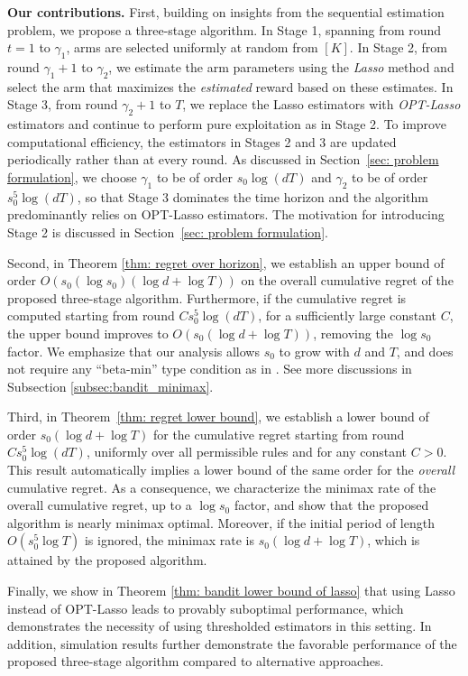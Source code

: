 \documentclass[aos,preprint]{imsart}
\theoremstyle{plain}
\theoremstyle{definition}
\begin{document}
 
\smallskip
\noindent \textbf{Our contributions.} First, building on insights from the sequential estimation problem, we propose a three-stage algorithm. In Stage 1, spanning from round $t = 1$ to $\gamma_1$, arms are selected uniformly at random from $[K]$. In Stage 2, from round $\gamma_1 + 1$ to $\gamma_2$, we estimate the arm parameters using the \textit{Lasso} method and select the arm that maximizes the \textit{estimated} reward based on these estimates. In Stage 3, from round $\gamma_2 + 1$ to $T$, we replace the Lasso estimators with \textit{OPT-Lasso} estimators and continue to perform pure exploitation as in Stage 2. 
To improve computational efficiency, the estimators in Stages 2 and 3 are updated periodically rather than at every round. As discussed in Section~\ref{sec: problem formulation}, we choose $\gamma_1$ to be of order $s_0 \log(dT)$ and $\gamma_2$ to be of order $s_0^5 \log(dT)$, so that Stage 3 dominates the time horizon and the algorithm predominantly relies on OPT-Lasso estimators. The motivation for introducing Stage 2 is discussed in Section~\ref{sec: problem formulation}.

Second, in Theorem \ref{thm: regret over horizon}, we establish an upper bound of order $O(s_0 (\log s_0) (\log d + \log T))$ on the overall cumulative regret of the proposed three-stage algorithm. Furthermore, if the cumulative regret is computed starting from round $C s_0^5 \log(dT)$, for a sufficiently large constant $C$, the upper bound improves to $O\left(s_0 (\log d + \log T)\right)$, removing the $\log s_0$ factor. We emphasize that our analysis allows $s_0$ to grow with $d$ and $T$, and does not require any ``beta-min'' type condition as in \cite{ariu2022thresholded}. See more discussions in Subsection \ref{subsec:bandit_minimax}.

Third, in Theorem~\ref{thm: regret lower bound}, we establish a lower bound of order $s_0 (\log d + \log T)$ for the cumulative regret starting from round $C s_0^5 \log(dT)$, uniformly over all permissible rules and for any constant $C > 0$. This result automatically implies a lower bound of the same order for the \textit{overall} cumulative regret. As a consequence, we characterize the minimax rate of the overall cumulative regret, up to a $\log s_0$ factor, and show that the proposed algorithm is nearly minimax optimal. Moreover, if the initial period of length $O(s_0^5 \log T)$ is ignored, the minimax rate is $s_0 (\log d + \log T)$, which is attained by the proposed algorithm.

Finally, we show in Theorem \ref{thm: bandit lower bound of lasso} that using Lasso instead of OPT-Lasso leads to provably suboptimal performance, which demonstrates the necessity of using thresholded estimators in this setting. 
In addition, simulation results further demonstrate the favorable performance of the proposed three-stage algorithm compared to alternative approaches.
\end{document}

